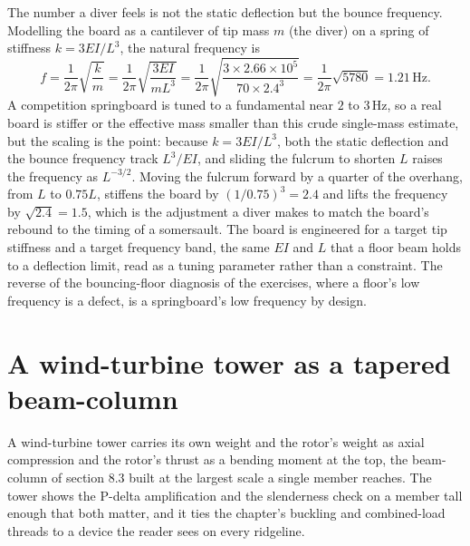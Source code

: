 The number a diver feels is not the static deflection but the bounce
frequency. Modelling the board as a cantilever of tip mass $m$ (the
diver) on a spring of stiffness $k = 3EI/L^3$, the natural frequency is
\[
f = \frac{1}{2\pi}\sqrt{\frac{k}{m}}
= \frac{1}{2\pi}\sqrt{\frac{3 EI}{m L^3}}
= \frac{1}{2\pi}\sqrt{\frac{3 \times 2.66 \times 10^5}
{70 \times 2.4^3}}
= \frac{1}{2\pi}\sqrt{5780} = 1.21\,\text{Hz}.
\]
A competition springboard is tuned to a fundamental near $2$ to
$3\,\text{Hz}$, so a real board is stiffer or the effective mass smaller
than this crude single-mass estimate, but the scaling is the point:
because $k = 3EI/L^3$, both the static deflection and the bounce
frequency track $L^3/EI$, and sliding the fulcrum to shorten $L$ raises
the frequency as $L^{-3/2}$. Moving the fulcrum forward by a quarter of
the overhang, from $L$ to $0.75L$, stiffens the board by $(1/0.75)^3 =
2.4$ and lifts the frequency by $\sqrt{2.4} = 1.5$, which is the
adjustment a diver makes to match the board's rebound to the timing of a
somersault. The board is engineered for a target tip stiffness and a
target frequency band, the same $EI$ and $L$ that a floor beam holds to a
deflection limit, read as a tuning parameter rather than a constraint.
The reverse of the bouncing-floor diagnosis of the exercises, where a
floor's low frequency is a defect, is a springboard's low frequency by
design.

\section{A wind-turbine tower as a tapered beam-column}

A wind-turbine tower carries its own weight and the rotor's weight as
axial compression and the rotor's thrust as a bending moment at the top,
the beam-column of section 8.3 built at the largest scale a single
member reaches. The tower shows the P-delta amplification and the
slenderness check on a member tall enough that both matter, and it ties
the chapter's buckling and combined-load threads to a device the reader
sees on every ridgeline.

